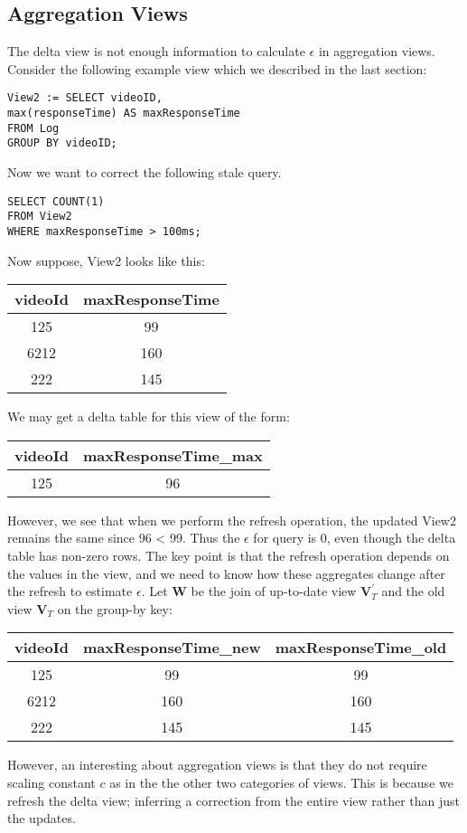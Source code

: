 \subsection{Aggregation Views}
The delta view is not enough information to calculate $\epsilon$ in aggregation views. 
Consider the following example view which we described in the last section:
\begin{lstlisting}
View2 := SELECT videoID, 
max(responseTime) AS maxResponseTime 
FROM Log
GROUP BY videoID;
\end{lstlisting}
Now we want to correct the following stale query.
\begin{lstlisting}
SELECT COUNT(1) 
FROM View2 
WHERE maxResponseTime > 100ms;
\end{lstlisting}
Now suppose, View2 looks like this:

\begin{tabular}{|c|c|}
\hline 
videoId & maxResponseTime\tabularnewline
\hline 
\hline 
125 & 99\tabularnewline
\hline 
6212 & 160\tabularnewline
\hline 
222 & 145\tabularnewline
\hline 
\end{tabular}

We may get a delta table for this view of the form:

\begin{tabular}{|c|c|}
\hline 
videoId & maxResponseTime\_max\tabularnewline
\hline 
\hline 
125 & 96\tabularnewline
\hline 
\end{tabular}

However, we see that when we perform the refresh operation, the updated
View2 remains the same since 96 < 99. 
Thus the $\epsilon$ for query is 0, even though the delta table has non-zero rows. 
The key point is that the refresh operation depends on the values in the view, 
and we need to know how these aggregates change
after the refresh to estimate $\epsilon$. 
Let $\textbf{W}$ be the join of up-to-date view $\textbf{V}_{T}^{'}$ and the old view $\textbf{V}_{T}$
on the group-by key:

\begin{tabular}{|c|c|c|}
\hline 
videoId & maxResponseTime\_new & maxResponseTime\_old \tabularnewline
\hline 
\hline 
125 & 99 & 99\tabularnewline
\hline 
6212 & 160 & 160\tabularnewline
\hline 
222 & 145 & 145\tabularnewline
\hline 
\end{tabular}

However, an interesting about aggregation views is that they do not 
require scaling constant $c$ as in the the other two categories of views.
This is because we refresh the delta view; inferring a correction from the
entire view rather than just the updates.

